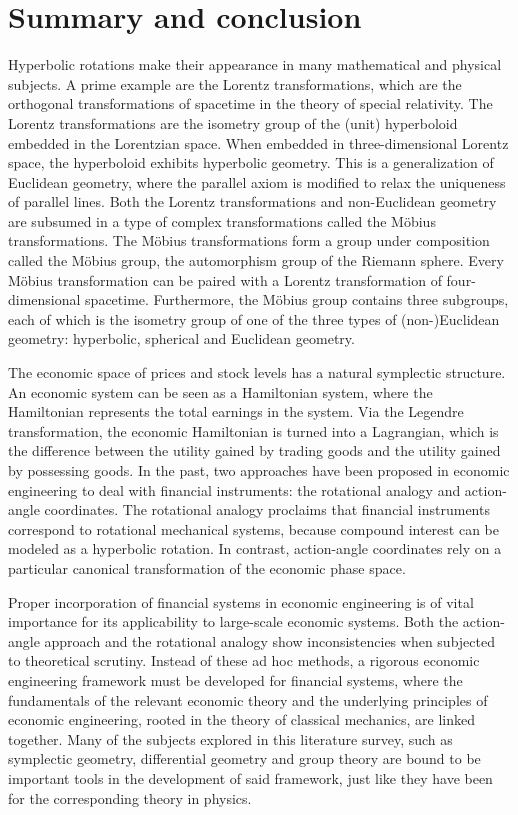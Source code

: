 \chapter{Summary and conclusion}
\label{chap:conclusion}

Hyperbolic rotations make their appearance in many mathematical and physical subjects. A prime example are the Lorentz transformations, which are the orthogonal transformations of spacetime in the theory of special relativity. The Lorentz transformations are the isometry group of the (unit) hyperboloid embedded in the Lorentzian space. When embedded in three-dimensional Lorentz space, the hyperboloid exhibits hyperbolic geometry. This is a generalization of Euclidean geometry, where the parallel axiom is modified to relax the uniqueness of parallel lines. Both the Lorentz transformations and non-Euclidean geometry are subsumed in a type of complex transformations called the Möbius transformations. The Möbius transformations form a group under composition called the Möbius group, the automorphism group of the Riemann sphere. Every Möbius transformation can be paired with a Lorentz transformation of four-dimensional spacetime. Furthermore, the Möbius group contains three subgroups, each of which is the isometry group of one of the three types of (non-)Euclidean geometry: hyperbolic, spherical and Euclidean geometry.

The economic space of prices and stock levels has a natural symplectic structure. An economic system can be seen as a Hamiltonian system, where the Hamiltonian represents the total earnings in the system. Via the Legendre transformation, the economic Hamiltonian is turned into a Lagrangian, which is the difference between the utility gained by trading goods and the utility gained by possessing goods. In the past, two approaches have been proposed in economic engineering to deal with financial instruments: the rotational analogy and action-angle coordinates. The rotational analogy proclaims that financial instruments correspond to rotational mechanical systems, because compound interest can be modeled as a hyperbolic rotation. In contrast, action-angle coordinates rely on a particular canonical transformation of the economic phase space.

Proper incorporation of financial systems in economic engineering is of vital importance for its applicability to large-scale economic systems. Both the action-angle approach and the rotational analogy show inconsistencies when subjected to theoretical scrutiny. Instead of these ad hoc methods, a rigorous economic engineering framework must be developed for financial systems, where the fundamentals of the relevant economic theory and the underlying principles of economic engineering, rooted in the theory of classical mechanics, are linked together. Many of the subjects explored in this literature survey, such as symplectic geometry, differential geometry and group theory are bound to be important tools in the development of said framework, just like they have been for the corresponding theory in physics.

